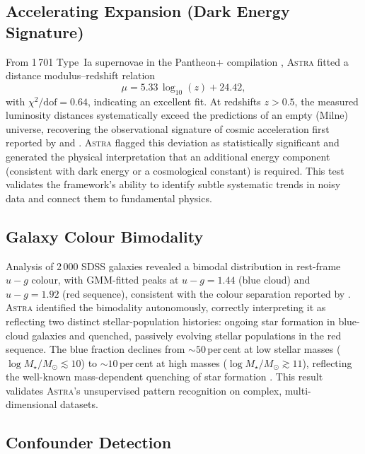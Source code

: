 \documentclass[fleqn,usenatbib]{mnras}
\newcommand{\astra}{\textsc{Astra}\xspace}
\begin{document}
\subsection{Accelerating Expansion (Dark Energy Signature)}
\label{sec:live:sne}

From 1\,701 Type~Ia supernovae in the Pantheon+ compilation \citep{Brout2022}, \astra fitted a distance modulus--redshift relation
\begin{equation}
  \mu = 5.33\,\log_{10}(z) + 24.42,
  \label{eq:sne}
\end{equation}
with $\chi^{2}/\mathrm{dof} = 0.64$, indicating an excellent fit.
At redshifts $z > 0.5$, the measured luminosity distances systematically exceed the predictions of an empty (Milne) universe, recovering the observational signature of cosmic acceleration first reported by \citet{Riess1998} and \citet{Perlmutter1999}.
\astra flagged this deviation as statistically significant and generated the physical interpretation that an additional energy component (consistent with dark energy or a cosmological constant) is required.
This test validates the framework's ability to identify subtle systematic trends in noisy data and connect them to fundamental physics.

\subsection{Galaxy Colour Bimodality}
\label{sec:live:bimodality}

Analysis of 2\,000 SDSS galaxies revealed a bimodal distribution in rest-frame $u{-}g$ colour, with GMM-fitted peaks at $u{-}g = 1.44$ (blue cloud) and $u{-}g = 1.92$ (red sequence), consistent with the colour separation reported by \citet{Strateva2001}.
\astra identified the bimodality autonomously, correctly interpreting it as reflecting two distinct stellar-population histories: ongoing star formation in blue-cloud galaxies and quenched, passively evolving stellar populations in the red sequence.
The blue fraction declines from ${\sim}50$\,per\,cent at low stellar masses ($\log M_{\star}/M_{\odot} \lesssim 10$) to ${\sim}10$\,per\,cent at high masses ($\log M_{\star}/M_{\odot} \gtrsim 11$), reflecting the well-known mass-dependent quenching of star formation \citep{Peng2010}.
This result validates \astra's unsupervised pattern recognition on complex, multi-dimensional datasets.

\subsection{Confounder Detection}
\label{sec:live:confounders}
\end{document}
